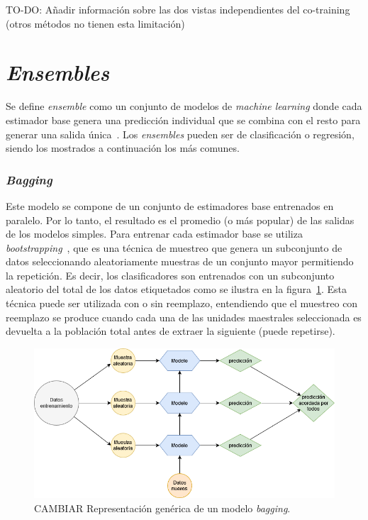 TO-DO: Añadir información sobre las dos vistas independientes del co-training (otros métodos no tienen esta limitación)


\section{\textit{Ensembles}}

Se define \textit{ensemble} como un conjunto de modelos de \textit{machine learning} donde cada estimador base genera una predicción individual que se combina con el resto para generar una salida única~\cite{originalCoForest2007}. Los \textit{ensembles} pueden ser de clasificación o regresión, siendo los mostrados a continuación los más comunes.
	
\subsubsection{\textit{Bagging}}

Este modelo se compone de un conjunto de estimadores base entrenados en paralelo. Por lo tanto, el resultado es el promedio (o más popular) de las salidas de los modelos simples. Para entrenar cada estimador base se utiliza \textit{bootstrapping}~\cite{engelen2018thesis}, que es una técnica de muestreo que genera un subconjunto de datos seleccionando aleatoriamente muestras de un conjunto mayor permitiendo la repetición. Es decir, los clasificadores son entrenados con un subconjunto aleatorio del total de los datos etiquetados como se ilustra en la figura~\ref{img:bagging}. Esta técnica puede ser utilizada con o sin reemplazo, entendiendo que el muestreo con reemplazo se produce cuando cada una de las unidades maestrales seleccionada es devuelta a la población total antes de extraer la siguiente (puede repetirse).

\begin{figure}[h]
	\caption{CAMBIAR Representación genérica de un modelo \textit{bagging}.}
	\label{img:bagging}
	\centering
	\includegraphics[width=\textwidth]{../img/memoria/bagging}
\end{figure}

